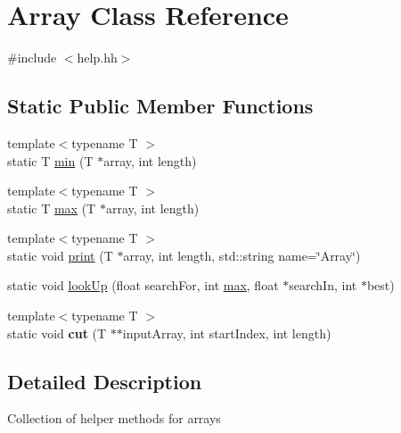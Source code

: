 \hypertarget{classArray}{\section{Array Class Reference}
\label{classArray}
}


{\ttfamily \#include $<$help.\-hh$>$}

\subsection*{Static Public Member Functions}
\begin{DoxyCompactItemize}
\item 
{\footnotesize template$<$typename T $>$ }\\static T \hyperlink{classArray_a2afa60e8e491ae59d37001a569014e41}{min} (T $\ast$array, int length)
\item 
{\footnotesize template$<$typename T $>$ }\\static T \hyperlink{classArray_a08b9fad689eb5fc9484cd63507aabb5f}{max} (T $\ast$array, int length)
\item 
{\footnotesize template$<$typename T $>$ }\\static void \hyperlink{classArray_aba3d93624f3b23b89923f7a82b5babac}{print} (T $\ast$array, int length, std\-::string name=\char`\"{}Array\char`\"{})
\item 
static void \hyperlink{classArray_a4319c070eabef19232b53b5926fa6bed}{look\-Up} (float search\-For, int \hyperlink{classArray_a08b9fad689eb5fc9484cd63507aabb5f}{max}, float $\ast$search\-In, int $\ast$best)
\item 
\hypertarget{classArray_a09ec3a135ecd687ebaa23408cc8940d2}{{\footnotesize template$<$typename T $>$ }\\static void {\bfseries cut} (T $\ast$$\ast$input\-Array, int start\-Index, int length)}\label{classArray_a09ec3a135ecd687ebaa23408cc8940d2}

\end{DoxyCompactItemize}


\subsection{Detailed Description}
Collection of helper methods for arrays 

